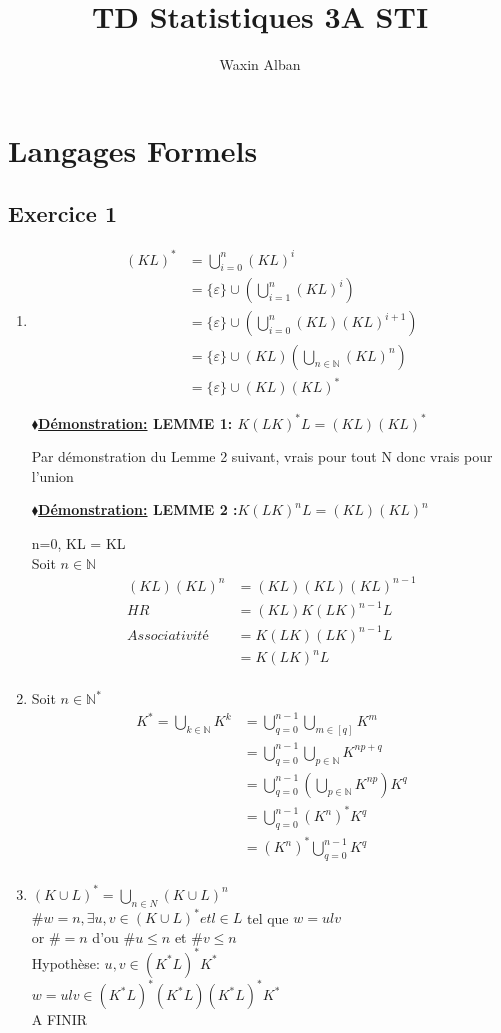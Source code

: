 \documentclass[12pt]{report}
\title{TD Statistiques 3A STI}
\author{Waxin Alban}
\newcommand{\blz}{$\blacklozenge$}
\newcommand{\demos}[1]
{
\begin{demo}
\textbf{\underline{\blz Démonstration:} #1}
\newline
}
\newcommand{\demoe}
{
\end{demo}
}
\newcommand{\N}{\mathbb{N}}
\begin{document}
\chapter{Langages Formels}
\section{Exercice 1}
\begin{enumerate}
    \item \begin{align*}
        (KL)^* &= \bigcup_{i=0}^n (KL)^i\\
               &= \lbrace \varepsilon \rbrace \cup (\bigcup_{i=1}^n (KL)^i)\\
               &= \lbrace \varepsilon \rbrace \cup (\bigcup_{i=0}^n(KL)(KL)^{i+1})\\
               &= \lbrace \varepsilon \rbrace \cup (KL)(\bigcup_{n\in \N}(KL)^{n})\\
               &= \lbrace \varepsilon \rbrace \cup (KL)(KL)^*
    \end{align*}
    \demos{LEMME 1: $K(LK)^*L = (KL)(KL)^*$}
        Par démonstration du Lemme 2 suivant, vrais pour tout N donc vrais pour l'union
    \demoe{}
    \demos{LEMME 2 :$K(LK)^nL = (KL)(KL)^n$}
        n=0,  KL = KL\\
        Soit $n \in \N$
        \begin{align*}
            (KL)(KL)^n &=  (KL)(KL)(KL)^{n-1}\\
            HR         &=  (KL)K(LK)^{n-1}L\\
            Associativité  &=  K(LK)(LK)^{n-1}L\\
                       &= K(LK)^n L\\
        \end{align*}
    \demoe{}
    \item Soit $n \in \N^*$ \\
    \begin{align*}
        K^*=\bigcup_{k\in\N}K^k &=\bigcup_{q=0}^{n-1} \bigcup_{m \in [q]}K^m\\
        &= \bigcup_{q=0}^{n-1} \bigcup_{p \in \N}K^{np+q}\\
        &= \bigcup_{q=0}^{n-1} (\bigcup_{p \in \N}K^{np})K^q\\
        &= \bigcup_{q=0}^{n-1} (K^n)^*K^q\\
        &= (K^n)^* \bigcup_{q=0}^{n-1} K^q\\
    \end{align*}
    \item $(K\cup L)^* = \bigcup_{n\in N} (K \cup L)^n$\\
    $\# w = n, \exists u,v \in (K \cup L)^* et l \in L$ tel que $ w = ulv$\\
    or $\# = n $ d'ou $\#u \leq n$ et $\#v \leq n$\\
    Hypothèse: $u,v \in (K^*L)^*K^*$\\
    $w = ulv \in (K^*L)^*(K^*L)(K^*L)^*K^*$\\
    A FINIR
\end{enumerate}
\end{document}
